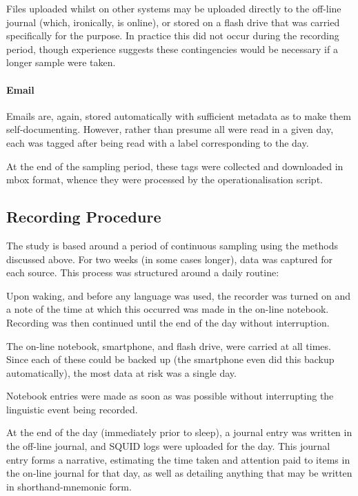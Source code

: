 Files uploaded whilst on other systems may be uploaded directly to the off-line journal (which, ironically, is online), or stored on a flash drive that was carried specifically for the purpose.  In practice this did not occur during the recording period, though experience suggests these contingencies would be necessary if a longer sample were taken.

\paragraph{Email}
Emails are, again, stored automatically with sufficient metadata as to make them self-documenting.  However, rather than presume all were read in a given day, each was tagged after being read with a label corresponding to the day.

At the end of the sampling period, these tags were collected and downloaded in mbox format, whence they were processed by the operationalisation script.









\subsection{Recording Procedure}
\label{sec:personal:recording}
The study is based around a period of continuous sampling using the methods discussed above.  For two weeks (in some cases longer), data was captured for each source.  This process was structured around a daily routine:

Upon waking, and before any language was used, the recorder was turned on and a note of the time at which this occurred was made in the on-line notebook.  Recording was then continued until the end of the day without interruption.

The on-line notebook, smartphone, and flash drive, were carried at all times.  Since each of these could be backed up (the smartphone even did this backup automatically), the most data at risk was a single day.

Notebook entries were made as soon as was possible without interrupting the linguistic event being recorded.

At the end of the day (immediately prior to sleep), a journal entry was written in the off-line journal, and SQUID logs were uploaded for the day.  This journal entry forms a narrative, estimating the time taken and attention paid to items in the on-line journal for that day, as well as detailing anything that may be written in shorthand-mnemonic form.










